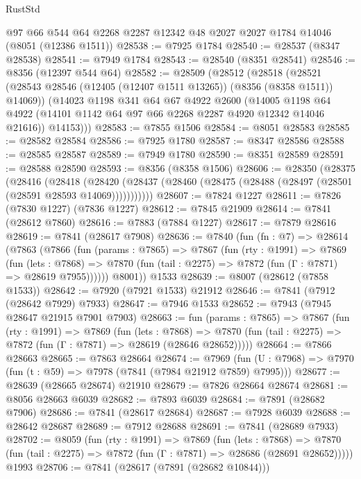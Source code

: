 \begin{lexlean}{RustStd}
\begin{coremodule}
{\begin{coremodule}
{{{{{{{{{{{{{{{{{{{{{{{{{{{{{{{{{{{{{{{{{{{{{{{{{{{{{{    @97
    @66
    @544
    @64
    @2268
    @2287
    @12342
    @48
    @2027
    @2027
    @1784
    @14046
    (@8051 (@12386 @1511))
@28538 := @7925 @1784
@28540 := @28537 (@8347 @28538)
@28541 := @7949 @1784
@28543 := @28540 (@8351 @28541)
@28546 := @8356 (@12397 @544 @64)
@28582 := @28509
    (@28512
      (@28518
        (@28521 (@28543 @28546 (@12405 (@12407 @1511 @13265)) (@8356 (@8358 @1511)) @14069))
        (@14023
          @1198
          @341
          @64
          @67
          @4922
          @2600
          (@14005 @1198 @64 @4922 (@14101 @1142 @64 @97 @66 @2268 @2287 @4920 @12342 @14046 @21616))
          @14153)))
@28583 := @7855 @1506
@28584 := @8051 @28583
@28585 := @28582 @28584
@28586 := @7925 @1780
@28587 := @8347 @28586
@28588 := @28585 @28587
@28589 := @7949 @1780
@28590 := @8351 @28589
@28591 := @28588 @28590
@28593 := @8356 (@8358 @1506)
@28606 := @28350
    (@28375
      (@28416
        (@28418
          (@28420 (@28437 (@28460 (@28475 (@28488 (@28497 (@28501 (@28591 @28593 @14069)))))))))))
@28607 := @7824 @1227
@28611 := @7826 (@7830 @1227) (@7836 @1227)
@28612 := @7845 @21909
@28614 := @7841 (@28612 @7860)
@28616 := @7883 (@7884 @1227)
@28617 := @7879 @28616
@28619 := @7841 (@28617 @7908)
@28636 := @7840
    (fun (fn : @7) =>
    @28614
      (@7863
        (@7866
          (fun (params : @7865) =>
          @7867
            (fun (rty : @1991) =>
            @7869
              (fun (lets : @7868) =>
              @7870 (fun (tail : @2275) => @7872 (fun (Γ : @7871) => @28619 @7955))))))
        @8001))
    @1533
@28639 := @8007 (@28612 (@7858 @1533))
@28642 := @7920 (@7921 @1533) @21912
@28646 := @7841 (@7912 (@28642 @7929) @7933)
@28647 := @7946 @1533
@28652 := @7943 (@7945 @28647 @21915 @7901 @7903)
@28663 := fun (params : @7865) =>
  @7867
    (fun (rty : @1991) =>
    @7869
      (fun (lets : @7868) =>
      @7870 (fun (tail : @2275) => @7872 (fun (Γ : @7871) => @28619 (@28646 @28652)))))
@28664 := @7866 @28663
@28665 := @7863 @28664
@28674 := @7969
    (fun (U : @7968) => @7970 (fun (t : @59) => @7978 (@7841 (@7984 @21912 @7859) @7995)))
@28677 := @28639 (@28665 @28674) @21910
@28679 := @7826 @28664 @28674
@28681 := @8056 @28663 @6039
@28682 := @7893 @6039
@28684 := @7891 (@28682 @7906)
@28686 := @7841 (@28617 @28684)
@28687 := @7928 @6039
@28688 := @28642 @28687
@28689 := @7912 @28688
@28691 := @7841 (@28689 @7933)
@28702 := @8059
    (fun (rty : @1991) =>
    @7869
      (fun (lets : @7868) =>
      @7870 (fun (tail : @2275) => @7872 (fun (Γ : @7871) => @28686 (@28691 @28652)))))
    @1993
@28706 := @7841 (@28617 (@7891 (@28682 @10844)))
}}}}}}}}}}}}}}}}}}}}}}}}}}}}}}}}}}}}}}}}}}}}}}}}}}}}}}
\end{coremodule}}
\end{coremodule}
\end{lexlean}
